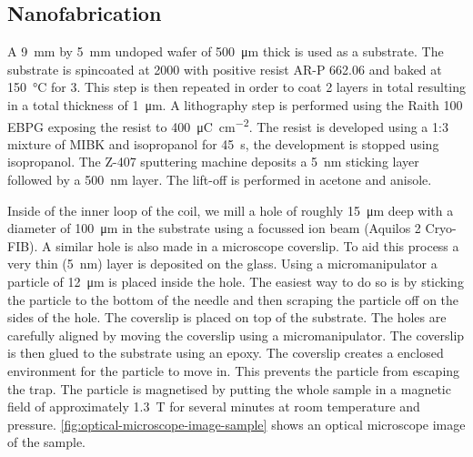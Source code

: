\subsection{Nanofabrication}
\label{subsec:nanofabrication}
A \qty{9}{\mm} by \qty{5}{\mm} undoped  wafer of \qty{500}{\um} thick is used as a substrate. The substrate is spincoated at \qty{2000}{\rpm} with positive resist AR-P 662.06 and baked at \qty{150}{\celsius} for \qty{3}{\min}. This step is then repeated in order to coat 2 layers in total resulting in a total thickness of \qty{1}{\um}. A lithography step is performed using the Raith 100 EBPG exposing the resist to \qty{400}{\micro\coulomb\per\square\cm}. The resist is developed using a 1:3 mixture of MIBK and isopropanol for \qty{45}{\s}, the development is stopped using isopropanol. The Z-407 sputtering machine deposits a \qty{5}{\nm}  sticking layer followed by a \qty{500}{\nm}  layer. The lift-off is performed in acetone and anisole.

Inside of the inner loop of the coil, we mill a hole of roughly \qty{15}{\um} deep with a diameter of \qty{100}{\um} in the  substrate using a  focussed ion beam (Aquilos 2 Cryo-FIB). A similar hole is also made in a microscope coverslip. To aid this process a very thin (\qty{5}{\nano\meter})  layer is deposited on the glass. Using a micromanipulator a  particle of \qty{12}{\um} is placed inside the  hole. The easiest way to do so is by sticking the particle to the bottom of the needle and then scraping the particle off on the sides of the  hole. The coverslip is placed on top of the  substrate. The holes are carefully aligned by moving the coverslip using a micromanipulator. The coverslip is then glued to the  substrate using an epoxy. The coverslip creates a enclosed environment for the particle to move in. This prevents the particle from escaping the trap. The particle is magnetised by putting the whole sample in a magnetic field of approximately \qty{1.3}{\tesla} for several minutes at room temperature and pressure. \autoref{fig:optical-microscope-image-sample} shows an optical microscope image of the sample.


